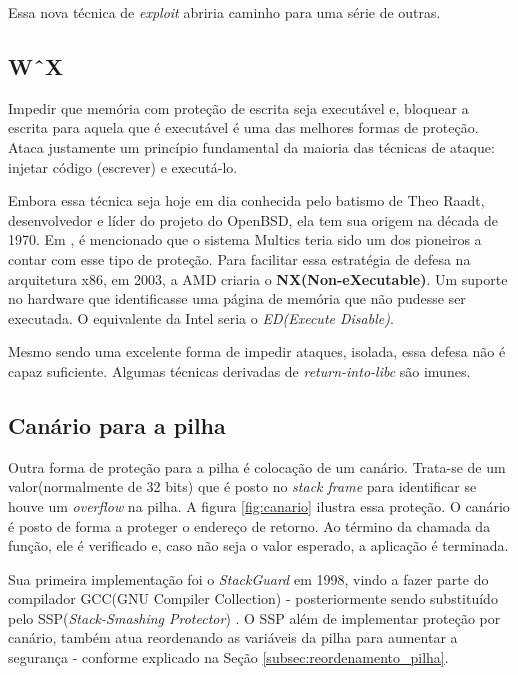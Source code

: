 			
			Essa nova técnica de \textsl{exploit} abriria caminho para uma série de outras.
		

		\subsection{W\^\ X}
			Impedir que memória com proteção de escrita seja executável e, bloquear a escrita
			para aquela que é executável é uma das melhores formas de proteção.
			Ataca justamente um princípio fundamental da maioria das técnicas de ataque: injetar código
			(escrever) e executá-lo.	
			

			Embora essa técnica seja hoje em dia conhecida pelo batismo de Theo Raadt, desenvolvedor
			e líder do projeto do OpenBSD, ela tem sua origem na década de 1970. Em \cite{Anley2007},
			é mencionado que o sistema Multics teria sido um dos pioneiros a contar com esse tipo de
			proteção. Para facilitar essa estratégia de defesa na arquitetura x86, em 2003, a AMD
			criaria o \textbf{NX(Non-eXecutable)}. Um suporte no hardware que identificasse uma página de
			memória que não pudesse ser executada. O equivalente da Intel seria o \textsl{ED(Execute Disable)}.


			Mesmo sendo uma excelente forma de impedir ataques, isolada, essa defesa não é capaz
			suficiente. Algumas técnicas derivadas de \textsl{return-into-libc} são imunes.


		\subsection{Canário para a pilha}
			Outra forma de proteção para a pilha é colocação de um canário.
			Trata-se de um valor(normalmente de 32 bits) que é posto no \textsl{stack frame}
			para identificar se houve um \textsl{overflow} na pilha.
			A figura \ref{fig:canario} ilustra essa proteção. O canário é posto de forma
			a proteger o endereço de retorno. Ao término da chamada da função, ele é verificado
			e, caso não seja o valor esperado, a aplicação é terminada.


			Sua primeira implementação foi o  \textsl{StackGuard} em 1998, vindo a fazer
			parte do compilador GCC(GNU Compiler Collection) - posteriormente sendo
			substituído pelo SSP(\textsl{Stack-Smashing Protector}) \cite{Martins2009}.
			O SSP além de implementar proteção por canário, também atua reordenando
			as variáveis da pilha para aumentar a segurança - conforme explicado 
			na Seção \ref{subsec:reordenamento_pilha}.

